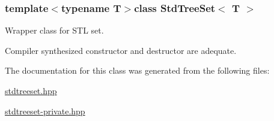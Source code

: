 \subsubsection*{template$<$typename T$>$class Std\-Tree\-Set$<$ T $>$}

Wrapper class for S\-T\-L set. 

Compiler synthesized constructor and destructor are adequate. 

The documentation for this class was generated from the following files\-:\begin{DoxyCompactItemize}
\item 
\hyperlink{stdtreeset_8hpp}{stdtreeset.\-hpp}\item 
\hyperlink{stdtreeset-private_8hpp}{stdtreeset-\/private.\-hpp}\end{DoxyCompactItemize}
